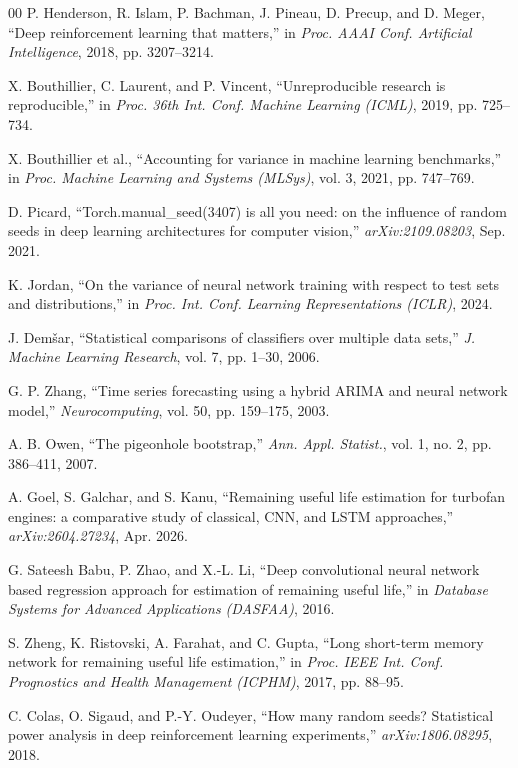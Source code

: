 \documentclass[conference]{IEEEtran}
\begin{document}
\begin{thebibliography}{00}
 P. Henderson, R. Islam, P. Bachman, J. Pineau, D. Precup, and D. Meger, ``Deep reinforcement learning that matters,'' in \emph{Proc. AAAI Conf. Artificial Intelligence}, 2018, pp. 3207--3214.

 X. Bouthillier, C. Laurent, and P. Vincent, ``Unreproducible research is reproducible,'' in \emph{Proc. 36th Int. Conf. Machine Learning (ICML)}, 2019, pp. 725--734.

 X. Bouthillier et al., ``Accounting for variance in machine learning benchmarks,'' in \emph{Proc. Machine Learning and Systems (MLSys)}, vol. 3, 2021, pp. 747--769.

 D. Picard, ``Torch.manual\_seed(3407) is all you need: on the influence of random seeds in deep learning architectures for computer vision,'' \emph{arXiv:2109.08203}, Sep. 2021.

 K. Jordan, ``On the variance of neural network training with respect to test sets and distributions,'' in \emph{Proc. Int. Conf. Learning Representations (ICLR)}, 2024.

 J. Dem\v{s}ar, ``Statistical comparisons of classifiers over multiple data sets,'' \emph{J. Machine Learning Research}, vol. 7, pp. 1--30, 2006.

 G. P. Zhang, ``Time series forecasting using a hybrid ARIMA and neural network model,'' \emph{Neurocomputing}, vol. 50, pp. 159--175, 2003.

 A. B. Owen, ``The pigeonhole bootstrap,'' \emph{Ann. Appl. Statist.}, vol. 1, no. 2, pp. 386--411, 2007.

 A. Goel, S. Galchar, and S. Kanu, ``Remaining useful life estimation for turbofan engines: a comparative study of classical, CNN, and LSTM approaches,'' \emph{arXiv:2604.27234}, Apr. 2026.

 G. Sateesh Babu, P. Zhao, and X.-L. Li, ``Deep convolutional neural network based regression approach for estimation of remaining useful life,'' in \emph{Database Systems for Advanced Applications (DASFAA)}, 2016.

 S. Zheng, K. Ristovski, A. Farahat, and C. Gupta, ``Long short-term memory network for remaining useful life estimation,'' in \emph{Proc. IEEE Int. Conf. Prognostics and Health Management (ICPHM)}, 2017, pp. 88--95.

 C. Colas, O. Sigaud, and P.-Y. Oudeyer, ``How many random seeds? Statistical power analysis in deep reinforcement learning experiments,'' \emph{arXiv:1806.08295}, 2018.


\end{thebibliography}
\end{document}
